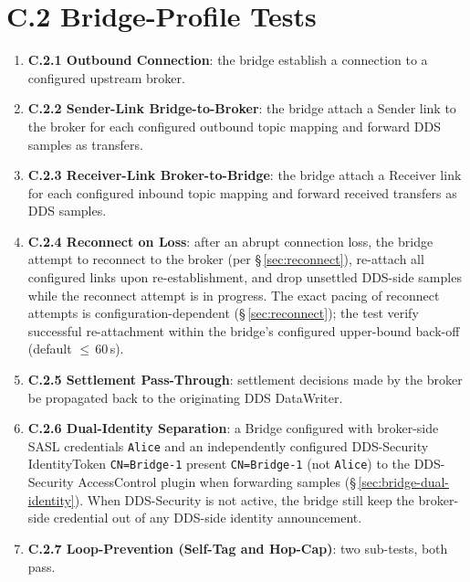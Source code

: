 \documentclass{../styles/zerodds-vendor-spec}
\begin{document}
\section*{C.2 Bridge-Profile Tests}

\begin{enumerate}
  \item \textbf{C.2.1 Outbound Connection}: the bridge
         establish a connection to a configured
        upstream broker.
  \item \textbf{C.2.2 Sender-Link Bridge-to-Broker}: the bridge
         attach a Sender link to the broker for each
        configured outbound topic mapping and forward DDS samples
        as transfers.
  \item \textbf{C.2.3 Receiver-Link Broker-to-Bridge}: the bridge
         attach a Receiver link for each configured
        inbound topic mapping and forward received transfers as
        DDS samples.
  \item \textbf{C.2.4 Reconnect on Loss}: after an abrupt
        connection loss, the bridge  attempt to
        reconnect to the broker (per \S\,\ref{sec:reconnect}),
         re-attach all configured links upon
        re-establishment, and  drop unsettled
        DDS-side samples while the reconnect attempt is in
        progress. The exact pacing of reconnect attempts is
        configuration-dependent (\S\,\ref{sec:reconnect}); the
        test  verify successful re-attachment within
        the bridge's configured upper-bound back-off (default
        $\le$\,60\,s).
  \item \textbf{C.2.5 Settlement Pass-Through}: settlement
        decisions made by the broker  be propagated
        back to the originating DDS DataWriter.
  \item \textbf{C.2.6 Dual-Identity Separation}: a Bridge
        configured with broker-side SASL credentials
        \texttt{Alice} and an independently configured DDS-Security
        IdentityToken \texttt{CN=Bridge-1}  present
        \texttt{CN=Bridge-1} (not \texttt{Alice}) to the DDS-Security
        AccessControl plugin when forwarding samples
        (\S\,\ref{sec:bridge-dual-identity}). When DDS-Security
        is not active, the bridge  still keep the
        broker-side credential out of any DDS-side identity
        announcement.
  \item \textbf{C.2.7 Loop-Prevention (Self-Tag and Hop-Cap)}:
        two sub-tests, both  pass.

\end{enumerate}
\end{document}
